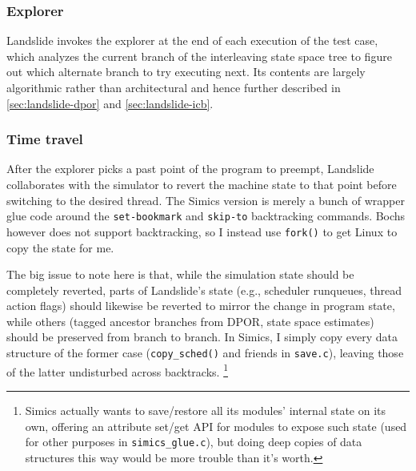 \subsubsection{Explorer}

Landslide invokes the explorer at the end of each execution of the test case,
which analyzes the current branch of the interleaving state space tree
to figure out which alternate branch to try executing next.
Its contents are largely algorithmic rather than architectural
and hence further described in \cref{sec:landslide-dpor} and \cref{sec:landslide-icb}.

\subsubsection{Time travel}
\label{sec:landslide-timetravel}

After the explorer picks a past point of the program to preempt, %
Landslide collaborates with the simulator to revert the machine state to that point before switching to the desired thread.
The Simics version is merely a bunch of wrapper glue code around the {\tt set-bookmark} and {\tt skip-to} backtracking commands.
Bochs however does not support backtracking, so I instead use {\tt fork()} to get Linux
to copy the  state for me.

The big issue to note here is that, while the simulation state should be completely reverted,
parts of Landslide's state (e.g., scheduler runqueues, thread action flags)
should likewise be reverted to mirror the change in program state,
while others (tagged ancestor branches from DPOR, state space estimates) should be preserved from branch to branch.
In Simics, I simply copy every data structure of the former case ({\tt copy\_sched()} and friends in {\tt save.c}),
leaving those of the latter undisturbed across backtracks.%
\footnote{Simics actually wants to save/restore all its modules' internal state on its own,
offering an attribute set/get API for modules to expose such state (used for other purposes in {\tt simics\_glue.c}),
but doing deep copies of data structures this way would be more trouble than it's worth.}

